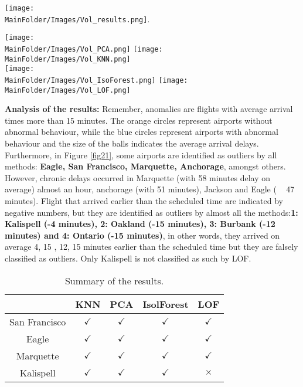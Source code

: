\begin{figure*}[ht]
    \centering
     \texttt{[image: \\MainFolder/Images/Vol\_results.png]}\label{fig02}.
    \caption{Airports detected as outliers by PCA, KNN, Isolation Forest and LOF.}%
    \texttt{[image: \\MainFolder/Images/Vol\_PCA.png]}
    \texttt{[image: \\MainFolder/Images/Vol\_KNN.png]}\\
    \texttt{[image: \\MainFolder/Images/Vol\_IsoForest.png]}
    \texttt{[image: \\MainFolder/Images/Vol\_LOF.png]}
    \caption{Airports detected as outliers by PCA (top left), KNN (top right), Isolation Forest (bottom left) and LOF (bottom right)}%
    \label{fig21}
\end{figure*}
\noindent\textbf{Analysis of the results:} 
 Remember, anomalies are flights with average arrival times more than 15 minutes. The orange circles represent airports without abnormal behaviour, while the blue circles represent airports with abnormal behaviour and the size of the balls indicates the average arrival delays. Furthermore, in Figure \ref{fig21}, some airports are identified as outliers by all methods: \textbf{Eagle, San Francisco, Marquette, Anchorage}, amongst others. However, chronic delays occurred in  Marquette (with 58 minutes delay on average) almost an hour, anchorage (with 51 minutes), Jackson and Eagle ( ~ 47 minutes). Flight that arrived earlier than the scheduled time are indicated by negative numbers, but they are identified as outliers by almost all the methods:\textbf{1: Kalispell (-4 minutes),  2: Oakland (-15 minutes),  3: Burbank (-12 minutes) and  4: Ontario (-15 minutes)}, in other words, they arrived on average  4, 15 , 12, 15 minutes earlier than the scheduled time but they are falsely classified as outliers.
Only Kalispell is not classified as such by LOF. 

\begin{table}
\centering
 \begin{tabular}{||c c c c c||} 
 \hline
 &  KNN & PCA & IsolForest & LOF\\ [0.5ex] 
 \hline\hline
San Francisco & $\checkmark$ & $\checkmark$  & $\checkmark$ & $\checkmark$ \\ 
 Eagle & $\checkmark$ & $\checkmark$  & $\checkmark$ & $\checkmark$ \\
Marquette & $\checkmark$ & $\checkmark$  & $\checkmark$ & $\checkmark$ \\
 Kalispell & $\checkmark$ & $\checkmark$  & $\checkmark$ & $\times$ \\ [1ex] 
 \hline
 \end{tabular}
 \caption{Summary of the results.}
 \label{fig2w}
\end{table}

